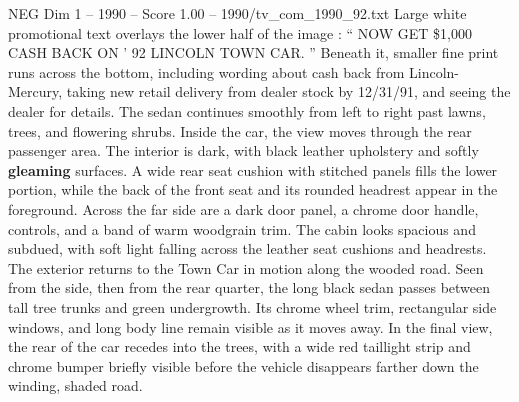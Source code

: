 \begin{textsample}{NEG Dim 1 – 1990 – Score 1.00 – 1990/tv\_com\_1990\_92.txt}
Large white promotional text overlays the lower half of the image : “ NOW GET \$1,000 CASH BACK ON ’ 92 LINCOLN TOWN CAR. ” Beneath it, smaller fine print runs across the bottom, including wording about cash back from Lincoln-Mercury, taking new retail delivery from dealer stock by 12/31/91, and seeing the dealer for details.
The sedan continues smoothly from left to right past lawns, trees, and flowering shrubs.
Inside the car, the view moves through the rear passenger area.
The interior is dark, with black leather upholstery and softly \textbf{gleaming} surfaces.
A wide rear seat cushion with stitched panels fills the lower portion, while the back of the front seat and its rounded headrest appear in the foreground.
Across the far side are a dark door panel, a chrome door handle, controls, and a band of warm woodgrain trim.
The cabin looks spacious and subdued, with soft light falling across the leather seat cushions and headrests.
The exterior returns to the Town Car in motion along the wooded road.
Seen from the side, then from the rear quarter, the long black sedan passes between tall tree trunks and green undergrowth.
Its chrome wheel trim, rectangular side windows, and long body line remain visible as it moves away.
In the final view, the rear of the car recedes into the trees, with a wide red taillight strip and chrome bumper briefly visible before the vehicle disappears farther down the winding, shaded road.

\end{textsample}
